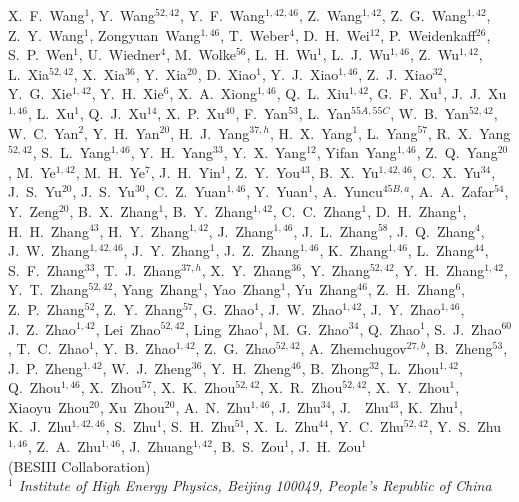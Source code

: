 \begin{small}
\begin{center}
X.~F.~Wang$^{1}$, Y.~Wang$^{52,42}$, Y.~F.~Wang$^{1,42,46}$, Z.~Wang$^{1,42}$, Z.~G.~Wang$^{1,42}$, Z.~Y.~Wang$^{1}$, Zongyuan~Wang$^{1,46}$, T.~Weber$^{4}$, D.~H.~Wei$^{12}$, P.~Weidenkaff$^{26}$, S.~P.~Wen$^{1}$, U.~Wiedner$^{4}$, M.~Wolke$^{56}$, L.~H.~Wu$^{1}$, L.~J.~Wu$^{1,46}$, Z.~Wu$^{1,42}$, L.~Xia$^{52,42}$, X.~Xia$^{36}$, Y.~Xia$^{20}$, D.~Xiao$^{1}$, Y.~J.~Xiao$^{1,46}$, Z.~J.~Xiao$^{32}$, Y.~G.~Xie$^{1,42}$, Y.~H.~Xie$^{6}$, X.~A.~Xiong$^{1,46}$, Q.~L.~Xiu$^{1,42}$, G.~F.~Xu$^{1}$, J.~J.~Xu$^{1,46}$, L.~Xu$^{1}$, Q.~J.~Xu$^{14}$, X.~P.~Xu$^{40}$, F.~Yan$^{53}$, L.~Yan$^{55A,55C}$, W.~B.~Yan$^{52,42}$, W.~C.~Yan$^{2}$, Y.~H.~Yan$^{20}$, H.~J.~Yang$^{37,h}$, H.~X.~Yang$^{1}$, L.~Yang$^{57}$, R.~X.~Yang$^{52,42}$, S.~L.~Yang$^{1,46}$, Y.~H.~Yang$^{33}$, Y.~X.~Yang$^{12}$, Yifan~Yang$^{1,46}$, Z.~Q.~Yang$^{20}$, M.~Ye$^{1,42}$, M.~H.~Ye$^{7}$, J.~H.~Yin$^{1}$, Z.~Y.~You$^{43}$, B.~X.~Yu$^{1,42,46}$, C.~X.~Yu$^{34}$, J.~S.~Yu$^{20}$, J.~S.~Yu$^{30}$, C.~Z.~Yuan$^{1,46}$, Y.~Yuan$^{1}$, A.~Yuncu$^{45B,a}$, A.~A.~Zafar$^{54}$, Y.~Zeng$^{20}$, B.~X.~Zhang$^{1}$, B.~Y.~Zhang$^{1,42}$, C.~C.~Zhang$^{1}$, D.~H.~Zhang$^{1}$, H.~H.~Zhang$^{43}$, H.~Y.~Zhang$^{1,42}$, J.~Zhang$^{1,46}$, J.~L.~Zhang$^{58}$, J.~Q.~Zhang$^{4}$, J.~W.~Zhang$^{1,42,46}$, J.~Y.~Zhang$^{1}$, J.~Z.~Zhang$^{1,46}$, K.~Zhang$^{1,46}$, L.~Zhang$^{44}$, S.~F.~Zhang$^{33}$, T.~J.~Zhang$^{37,h}$, X.~Y.~Zhang$^{36}$, Y.~Zhang$^{52,42}$, Y.~H.~Zhang$^{1,42}$, Y.~T.~Zhang$^{52,42}$, Yang~Zhang$^{1}$, Yao~Zhang$^{1}$, Yu~Zhang$^{46}$, Z.~H.~Zhang$^{6}$, Z.~P.~Zhang$^{52}$, Z.~Y.~Zhang$^{57}$, G.~Zhao$^{1}$, J.~W.~Zhao$^{1,42}$, J.~Y.~Zhao$^{1,46}$, J.~Z.~Zhao$^{1,42}$, Lei~Zhao$^{52,42}$, Ling~Zhao$^{1}$, M.~G.~Zhao$^{34}$, Q.~Zhao$^{1}$, S.~J.~Zhao$^{60}$, T.~C.~Zhao$^{1}$, Y.~B.~Zhao$^{1,42}$, Z.~G.~Zhao$^{52,42}$, A.~Zhemchugov$^{27,b}$, B.~Zheng$^{53}$, J.~P.~Zheng$^{1,42}$, W.~J.~Zheng$^{36}$, Y.~H.~Zheng$^{46}$, B.~Zhong$^{32}$, L.~Zhou$^{1,42}$, Q.~Zhou$^{1,46}$, X.~Zhou$^{57}$, X.~K.~Zhou$^{52,42}$, X.~R.~Zhou$^{52,42}$, X.~Y.~Zhou$^{1}$, Xiaoyu~Zhou$^{20}$, Xu~Zhou$^{20}$, A.~N.~Zhu$^{1,46}$, J.~Zhu$^{34}$, J.~~Zhu$^{43}$, K.~Zhu$^{1}$, K.~J.~Zhu$^{1,42,46}$, S.~Zhu$^{1}$, S.~H.~Zhu$^{51}$, X.~L.~Zhu$^{44}$, Y.~C.~Zhu$^{52,42}$, Y.~S.~Zhu$^{1,46}$, Z.~A.~Zhu$^{1,46}$, J.~Zhuang$^{1,42}$, B.~S.~Zou$^{1}$, J.~H.~Zou$^{1}$
\\
\vspace{0.2cm}
(BESIII Collaboration)\\
\vspace{0.2cm} {\it
$^{1}$ Institute of High Energy Physics, Beijing 100049, People's Republic of China\\
}
\end{center}
\end{small}
